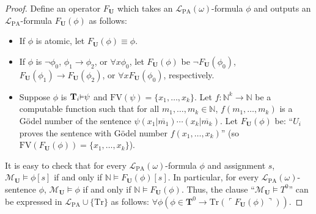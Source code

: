 \documentclass[reqno]{article}
\theoremstyle{definition}
\def\L{\mathscr{L}}
\def\M{\mathscr{M}}
\def\T{\mathbf{T}}
\def\U{\mathbf{U}}
\def\FV{\mathrm{FV}}
\def\LPA{\L_{\mathrm{PA}}}
\def\Tr{\mathrm{Tr}}
\renewcommand{\Pr}[1]{\T_{#1}\mbox{\small${\vDash}$}}
\begin{document}
\begin{proof}
Define an operator $F_\U$ which takes an $\LPA(\omega)$-formula $\phi$ and outputs
an $\LPA$-formula $F_\U(\phi)$ as follows:
\begin{itemize}
    \item
    If $\phi$ is atomic, let $F_\U(\phi)\equiv \phi$.
    \item
    If $\phi$ is $\neg\phi_0$, $\phi_1\rightarrow\phi_2$,
    or $\forall x\phi_0$, let $F_\U(\phi)$
    be $\neg F_\U(\phi_0)$, $F_\U(\phi_1)\rightarrow F_\U(\phi_2)$,
    or $\forall x F_\U(\phi_0)$, respectively.
    \item
    Suppose $\phi$ is $\Pr i \psi$ and $\FV(\psi)=\{x_1,\ldots,x_k\}$.
    Let $f:\mathbb N^k\to\mathbb N$ be a computable function such that
    for all $m_1,\ldots,m_k\in\mathbb N$,
    $f(m_1,\ldots,m_k)$ is a G\"odel number of
    the sentence $\psi(x_1|\overline{m_1})\cdots (x_k|\overline{m_k})$.
    Let $F_\U(\phi)$ be: ``$U_i$ proves
    the sentence with G\"odel number $f(x_1,\ldots,x_k)$''
    (so $\FV(F_\U(\phi))=\{x_1,\ldots,x_k\}$).
\end{itemize}
It is easy to check that for every $\LPA(\omega)$-formula $\phi$ and assignment $s$,
$\M_\U\models\phi[s]$ if and only if $\mathbb N\models F_\U(\phi)[s]$.
In particular, for every $\LPA(\omega)$-sentence $\phi$, $\M_\U\models\phi$
if and only if $\mathbb N\models F_\U(\phi)$. Thus,
the clause ``$\M_\U\models T^0$'' can be expressed
in $\LPA\cup\{\Tr\}$ as follows:
$\forall \phi(\phi\in \T^0\rightarrow \Tr(\ulcorner F_\U(\phi)\urcorner))$.
\end{proof}
\end{document}
